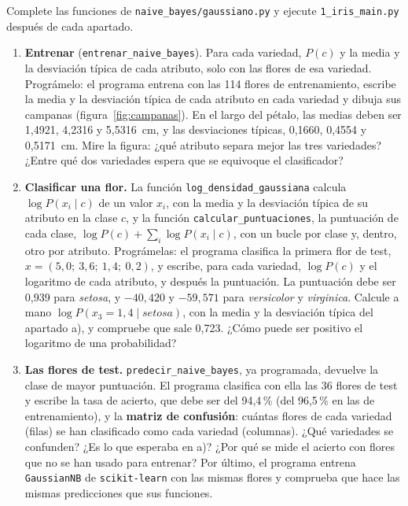 \documentclass{article}
\begin{document}
\begin{exercise}[breakable]\label{ej:iris}
Complete las funciones de \texttt{naive\_bayes/gaussiano.py} y ejecute \texttt{1\_iris\_main.py} después de cada apartado.
\begin{enumerate}
    \item[a)] \textbf{Entrenar} (\texttt{entrenar\_naive\_bayes}). Para cada variedad, $P(c)$ y la media y la desviación típica de cada atributo, solo con las flores de esa variedad. Prográmelo: el programa entrena con las 114 flores de entrenamiento, escribe la media y la desviación típica de cada atributo en cada variedad y dibuja sus campanas (figura~\ref{fig:campanas}). En el largo del pétalo, las medias deben ser 1,4921, 4,2316 y 5,5316~cm, y las desviaciones típicas, 0,1660, 0,4554 y 0,5171~cm. Mire la figura: ¿qué atributo separa mejor las tres variedades? ¿Entre qué dos variedades espera que se equivoque el clasificador?
    \item[b)] \textbf{Clasificar una flor.} La función \texttt{log\_densidad\_gaussiana} calcula $\log P(x_i \mid c)$ de un valor $x_i$, con la media y la desviación típica de su atributo en la clase $c$, y la función \texttt{calcular\_puntuaciones}, la puntuación de cada clase, $\log P(c) + \sum_i \log P(x_i \mid c)$, con un bucle por clase y, dentro, otro por atributo. Prográmelas: el programa clasifica la primera flor de test, $x = (5{,}0;\ 3{,}6;\ 1{,}4;\ 0{,}2)$, y escribe, para cada variedad, $\log P(c)$ y el logaritmo de cada atributo, y después la puntuación. La puntuación debe ser 0,939 para \textit{setosa}, y $-40{,}420$ y $-59{,}571$ para \textit{versicolor} y \textit{virginica}. Calcule a mano $\log P(x_3 = 1{,}4 \mid \textit{setosa})$, con la media y la desviación típica del apartado a), y compruebe que sale 0,723. ¿Cómo puede ser positivo el logaritmo de una probabilidad?
    \item[c)] \textbf{Las flores de test.} \texttt{predecir\_naive\_bayes}, ya programada, devuelve la clase de mayor puntuación. El programa clasifica con ella las 36 flores de test y escribe la tasa de acierto, que debe ser del 94,4\,\% (del 96,5\,\% en las de entrenamiento), y la \textbf{matriz de confusión}: cuántas flores de cada variedad (filas) se han clasificado como cada variedad (columnas). ¿Qué variedades se confunden? ¿Es lo que esperaba en a)? ¿Por qué se mide el acierto con flores que no se han usado para entrenar? Por último, el programa entrena \texttt{GaussianNB} de \texttt{scikit-learn} con las mismas flores y comprueba que hace las mismas predicciones que sus funciones.
\end{enumerate}
\end{exercise}
\end{document}
